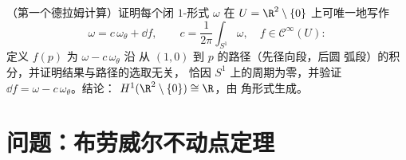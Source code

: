 \begin{exercise}[$\star\star\star$]\label{exo:b3:forms:12}
（第一个德拉姆计算）证明每个闭 $1$-形式
$\omega$ 在 $U = \R^2\setminus\{0\}$ 上可唯一地写作
\[
\omega = c\,\omega_\theta + \dd f,
\qquad c = \frac1{2\pi}\int_{S^1}\omega,\quad f \in
\mathcal C^\infty(U) :
\]
定义 $f(p)$ 为 $\omega - c\,\omega_\theta$ 沿
从 $(1,0)$ 到 $p$ 的路径（先径向段，后圆
弧段）的积分，并证明结果与路径的选取无关，
恰因 $S^1$ 上的周期为零，并验证 $\dd
f = \omega - c\,\omega_\theta$。结论：
$H^1(\R^2\setminus\{0\}) \cong \R$，由
角形式生成。
\end{exercise}

\section{问题：布劳威尔不动点定理}


